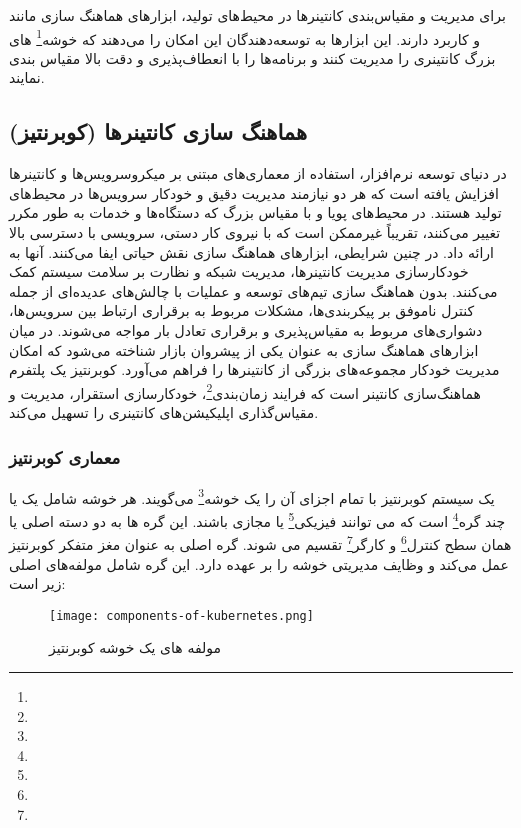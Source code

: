 برای مدیریت و مقیاس‌بندی کانتینرها در محیط‌های تولید، ابزارهای هماهنگ سازی مانند  و  کاربرد دارند. این ابزارها به توسعه‌دهندگان این امکان را می‌دهند که خوشه\footnote{} های  بزرگ کانتینری را مدیریت کنند و برنامه‌ها را با انعطاف‌پذیری و دقت بالا مقیاس بندی نمایند.

\subsection{هماهنگ سازی کانتینرها (کوبرنتیز)}

در دنیای توسعه نرم‌افزار، استفاده از معماری‌های مبتنی بر میکروسرویس‌ها و کانتینرها افزایش یافته است که هر دو نیازمند مدیریت دقیق و خودکار سرویس‌ها در محیط‌های تولید هستند. در محیط‌های پویا و با مقیاس بزرگ که دستگاه‌ها و خدمات به طور مکرر تغییر می‌کنند، تقریباً غیرممکن است که با نیروی کار دستی، سرویسی با دسترسی بالا ارائه داد. در چنین شرایطی، ابزارهای هماهنگ سازی نقش حیاتی ایفا می‌کنند. آنها به خودکارسازی مدیریت کانتینرها، مدیریت شبکه و نظارت بر سلامت سیستم کمک می‌کنند. بدون هماهنگ سازی تیم‌های توسعه و عملیات با چالش‌های عدیده‌ای از جمله کنترل ناموفق بر پیکربندی‌ها، مشکلات مربوط به برقراری ارتباط بین سرویس‌ها، دشواری‌های مربوط به مقیاس‌پذیری و برقراری تعادل بار مواجه می‌شوند. در میان ابزارهای هماهنگ سازی  به عنوان یکی از پیشروان بازار شناخته می‌شود که امکان مدیریت خودکار مجموعه‌های بزرگی از کانتینرها را فراهم می‌آورد. کوبرنتیز یک پلتفرم هماهنگ‌سازی کانتینر است که فرایند زمان‌بندی\footnote{}، خودکارسازی استقرار، مدیریت و مقیاس‌گذاری اپلیکیشن‌های کانتینری را تسهیل می‌کند.

\subsubsection{معماری کوبرنتیز}
یک سیستم کوبرنتیز با تمام اجزای آن را یک خوشه\footnote{} می‌گویند. هر خوشه شامل یک یا چند گره\footnote{} است که می توانند فیزیکی\footnote{} یا مجازی باشند. این گره ها به دو دسته اصلی یا همان سطح کنترل\footnote{} و کارگر\footnote{} تقسیم می شوند.
گره اصلی به عنوان مغز متفکر کوبرنتیز عمل می‌کند و وظایف مدیریتی خوشه را بر عهده دارد. این گره شامل مولفه‌های اصلی زیر است:

\begin{figure}[t]
	\centering
	\texttt{[image: components-of-kubernetes.png]}
	\caption{مولفه های یک خوشه کوبرنتیز}
	\label{fig: components of kuber}
\end{figure}

